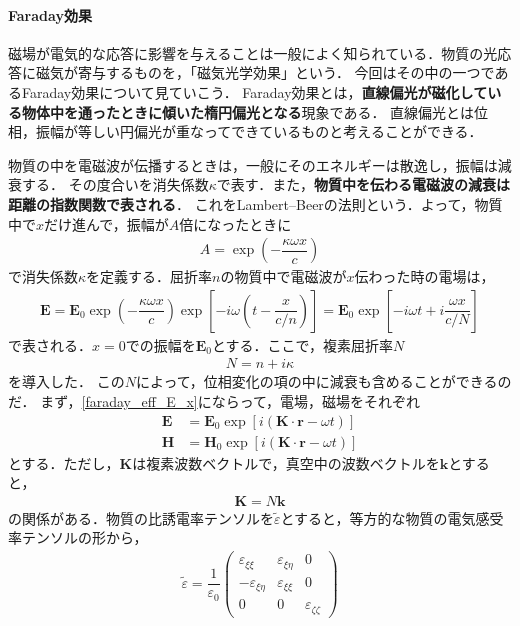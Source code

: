 \paragraph{Faraday効果}
磁場が電気的な応答に影響を与えることは一般によく知られている．物質の光応答に磁気が寄与するものを，「磁気光学効果」という．
今回はその中の一つであるFaraday効果について見ていこう．
Faraday効果とは，\textbf{直線偏光が磁化している物体中を通ったときに傾いた楕円偏光となる}現象である．
直線偏光とは位相，振幅が等しい円偏光が重なってできているものと考えることができる．

物質の中を電磁波が伝播するときは，一般にそのエネルギーは散逸し，振幅は減衰する．
その度合いを消失係数$\kappa$で表す．また，\textbf{物質中を伝わる電磁波の減衰は距離の指数関数で表される}．
これをLambert–Beerの法則という．よって，物質中で$x$だけ進んで，振幅が$A$倍になったときに
\begin{align}
  A=\exp\left( - \dfrac{\kappa\omega{x}}{c}\right)
\end{align}
で消失係数$\kappa$を定義する．屈折率$n$の物質中で電磁波が$x$伝わった時の電場は，
\begin{align}
  \boldsymbol{E}=\boldsymbol{E}_0\exp\left( - \dfrac{\kappa\omega{x}}{c}\right)\exp\left[ - i\omega\left(t - \dfrac{x}{c/n}\right)\right] = \boldsymbol{E}_0\exp\left[ - i\omega{t}+i\dfrac{\omega{x}}{c/N}\right]
  \label{faraday_eff_E_x}
\end{align}
で表される．$x=0$での振幅を$\boldsymbol{E}_0$とする．ここで，複素屈折率$N$
\begin{align}
  N=n+i\kappa
\end{align}
を導入した．
この$N$によって，位相変化の項の中に減衰も含めることができるのだ．
まず，\eqref{faraday_eff_E_x}にならって，電場，磁場をそれぞれ
\begin{align}
  \boldsymbol{E} &= \boldsymbol{E}_0\exp\left[i(\boldsymbol{K}\cdot\boldsymbol{r} - \omega{t})\right]\label{faraday_eff_Edef}\\
  \boldsymbol{H} &= \boldsymbol{H}_0\exp\left[i(\boldsymbol{K}\cdot\boldsymbol{r} - \omega{t})\right]\label{faraday_eff_Hdef}
\end{align}
とする．ただし，$\boldsymbol{K}$は複素波数ベクトルで，真空中の波数ベクトルを$\boldsymbol{k}$とすると，
\begin{align}
  \boldsymbol{K}=N\boldsymbol{k}\label{faraday_eff_K}
\end{align}
の関係がある．物質の比誘電率テンソルを$\tilde{\varepsilon}$とすると，等方的な物質の電気感受率テンソルの形から，
\begin{align}
  \tilde{\varepsilon}=
  \dfrac{1}{\varepsilon_0}
  \left(
  \begin{array}{ccc}
    \varepsilon_{\xi\xi} & \varepsilon_{\xi\eta} & 0 \\
    - \varepsilon_{\xi\eta} & \varepsilon_{\xi\xi} & 0 \\
    0 & 0 & \varepsilon_{\zeta\zeta}
  \end{array}
  \right)
  \label{faraday_eff_tensor}
\end{align}
